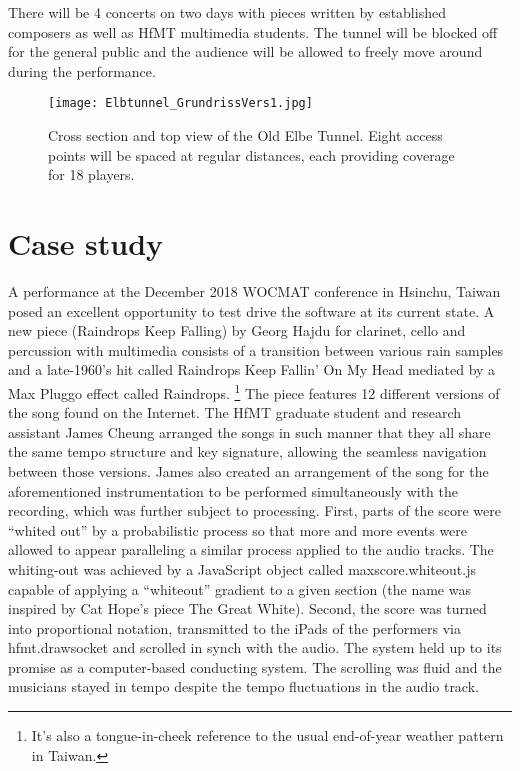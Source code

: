 There will be 4 concerts on two days with pieces written by established composers as well as HfMT multimedia students. The tunnel will be blocked off for the general public and the audience will be allowed to freely move around during the performance.

\begin{figure*}[h]
    \centering
    \begin{minipage}{1.\textwidth}
        \centering
        \texttt{[image: Elbtunnel\_GrundrissVers1.jpg]} 
       	\caption{Cross section and top view of the Old Elbe Tunnel. Eight access points will be spaced at regular distances, each providing coverage for 18 players.
\label{fig:Elbtunnel_GrundrissVers1.jpg}}
    \end{minipage}
\end{figure*}


\section{Case study}

A performance  at the December 2018 WOCMAT conference in Hsinchu, Taiwan posed an excellent opportunity to test drive the software at its current state.
A new piece (Raindrops Keep Falling) by Georg Hajdu for clarinet, cello and percussion with multimedia consists of a transition between various rain samples and a late-1960’s hit called Raindrops Keep Fallin' On My Head mediated by a Max Pluggo effect called Raindrops. \footnote{It’s also a tongue-in-cheek reference to the usual end-of-year weather pattern in Taiwan.} The piece features 12 different versions of the song found on the Internet. The HfMT graduate student and research assistant James Cheung arranged the songs in such manner that they all share the same tempo structure and key signature, allowing the seamless navigation between those versions. James also created an arrangement of the song for the aforementioned instrumentation to be performed simultaneously with the recording, which was further subject to processing. First, parts of the score were “whited out” by a probabilistic process so that more and more events were allowed to appear paralleling a similar process applied to the audio tracks. The whiting-out was achieved by a JavaScript object called maxscore.whiteout.js capable of applying a “whiteout” gradient to a given section (the name was inspired by Cat Hope’s piece The Great White). Second, the score was turned into proportional notation, transmitted to the iPads of the performers via hfmt.drawsocket and scrolled in synch with the audio. The system held up to its promise as a computer-based conducting system. The scrolling was fluid and the musicians stayed in tempo despite the tempo fluctuations in the audio track. 

